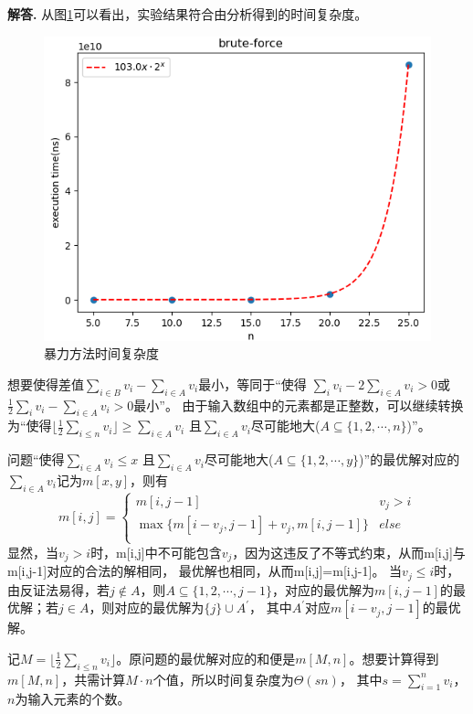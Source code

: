 \documentclass[12pt, a4paper, oneside]{article}
\newenvironment{solution}{\par\noindent\textbf{解答. }}{}
\begin{document}
\begin{solution}
从图\ref{brute}可以看出，实验结果符合由分析得到的时间复杂度。

\begin{figure}
    \centering
    \includegraphics[scale = 0.6]{brute.png}
    \caption{暴力方法时间复杂度}\label{brute}
\end{figure}

想要使得差值$\sum_{i\in B}v_i-\sum_{i\in A}v_i$最小，等同于“使得
$\sum_{i}v_i-2\sum_{i\in A}v_i>0$或$\frac{1}{2}\sum_{i}v_i-\sum_{i\in A}v_i>0$最小”。
由于输入数组中的元素都是正整数，可以继续转换为“使得$\lfloor\frac{1}{2}\sum_{i\leq n}v_i\rfloor\geq\sum_{i\in A}v_i$
且$\sum_{i\in A}v_i$尽可能地大($A\subseteq\{1,2,\cdots,n\}$)”。

问题“使得$\sum_{i\in A}v_i\leq x$
且$\sum_{i\in A}v_i$尽可能地大($A\subseteq\{1,2,\cdots,y\}$)”的最优解对应的$\sum_{i\in A}v_i$记为$m[x,y]$，则有
\[m[i,j] = \begin{cases}
    m[i,j-1]&v_{j}>i\\
    \max \{m[i-v_j,j-1]+v_j,m[i,j-1]\}&else\\
\end{cases}\]
显然，当$v_j>i$时，m[i,j]中不可能包含$v_j$，因为这违反了不等式约束，从而m[i,j]与m[i,j-1]对应的合法的解相同，
最优解也相同，从而m[i,j]=m[i,j-1]。
当$v_j\leq i$时，由反证法易得，若$j\notin A$，则$A\subseteq\{1,2,\cdots,j-1\}$，对应的最优解为$m[i,j-1]$的最优解；若$j \in A$，则对应的最优解为$\{j\}\cup A^{\prime}$，
其中$A^{\prime}$对应$m[i-v_j,j-1]$的最优解。

 记$M = \lfloor\frac{1}{2}\sum_{i\leq n}v_i\rfloor$。原问题的最优解对应的和便是$m[M,n]$。想要计算得到$m[M,n]$，共需计算$M\cdot n$个值，所以时间复杂度为$\Theta(sn)$，
其中$s = \sum_{i=1}^{n}v_i$，$n$为输入元素的个数。


\end{solution}
\end{document}
